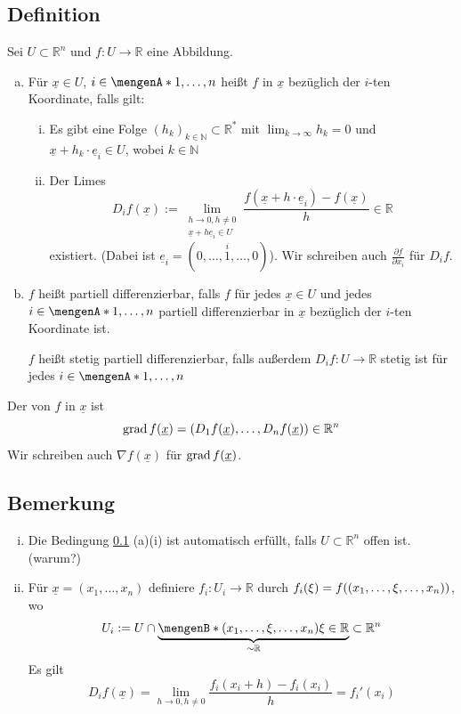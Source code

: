 \subsection[Definition: Partielle Differenzierbarkeit]{Definition} %
\label{sub:61}
Sei $U \subset \mathds{R}^n$ und $f : U \to \mathds{R}$ eine Abbildung. 
\begin{enumerate}[a)]
	\item Für $\underline{x} \in U $, $i \in \set{1,\ldots,n}$ heißt $f$  in $\underline{x} $ bezüglich der $i$-ten Koordinate, falls gilt:
	\begin{enumerate}[(i)]
		\item Es gibt eine Folge $(h_k)_{k \in \mathds{N}} \subset \mathds{R}^*$ mit $\lim_{ k \to \infty} h_k = 0$ und $\underline{x} + h_k \cdot \underline{e}_i \in U $,
		wobei $k \in \mathds{N}$
		\item Der Limes 
		\[
			D_i f(\underline{x}) := \lim_{ \substack{h \to 0, h \not= 0 \\ \underline{x} + h \underline{e}_i \in U  }}  \frac{f( \underline{x} + h \cdot\underline{e}_i) - 
			f(\underline{x} )}{h} \in \mathds{R}
		\]
		existiert. (Dabei ist $\underline{e}_i = ( 0, \ldots , \stackrel{i}{1}, \ldots , 0)$). Wir schreiben auch $\frac{\partial f}{\partial x_i} $ für $D_i f$.
	\end{enumerate}
	\item $f$ heißt partiell differenzierbar, falls $f$ für jedes $\underline{x} \in U $ und jedes $i \in \set{1, \ldots , n} $ partiell differenzierbar in $\underline{x} $
	bezüglich der $i$-ten Koordinate ist.
	
	$f$ heißt stetig partiell differenzierbar, falls außerdem $D_i f : U  \to \mathds{R}$ stetig ist für jedes $i \in \set{1, \ldots , n} $
\end{enumerate}
Der  von $f$ in $\underline{x}$ ist 
\[
	\operatorname{grad} f(\underline{x}) = ( D_1 f(\underline{x}), \ldots , D_n f(\underline{x}) ) \in \mathbb{R}^n 
\]
Wir schreiben auch $\nabla f(\underline{x})$ für $\operatorname{grad} f(\underline{x} )$.

\subsection[Bemerkung zur partiellen Differenzierbarkeit]{Bemerkung} %
\label{sub:62}
\begin{enumerate}[(i)]
	\item Die Bedingung \ref{sub:61} (a)(i) ist automatisch erfüllt, falls $U \subset \mathds{R}^n$ offen ist. \hfill (warum?)
	\item Für $\underline{x}= (x_1, \ldots , x_n) $ definiere $f_i : U_i \to \mathds{R}$ durch $f_i(\xi) = f ( (x_1, \ldots , \xi, \ldots , x_n)) $, wo 
	\[
		U_i := U \cap \underbrace{\set[(x_1, \ldots , \xi, \ldots , x_n)]{\xi \in \mathds{R}}}_{\sim \mathds{R}}  \subset \mathds{R}^n
	\]
	Es gilt
	\[
		D_i f (\underline{x} ) =  \lim_{ h \to 0, h \not= 0} \frac{f_i (x_i +h) - f_i(x_i)}{h}  = f_i' (x_i)
	\]
\end{enumerate}

